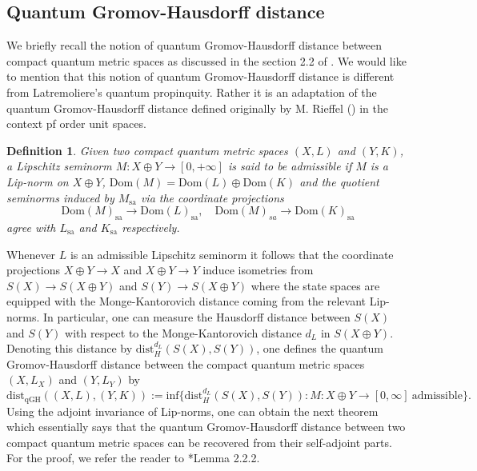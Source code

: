 \documentclass[a4paper,11pt,reqno]{amsart}
\theoremstyle{plain}
\newtheorem{defn}[thm]{Definition}
\theoremstyle{mainthmstyle}
\theoremstyle{named}
\numberwithin{equation}{section}
\begin{document}
\subsection{Quantum Gromov-Hausdorff distance} We briefly recall the notion of quantum Gromov-Hausdorff distance between compact quantum metric spaces as discussed in the section 2.2 of \cite{Kaad-Kyed}. We would like to mention that this notion of quantum Gromov-Hausdorff distance is different from Latremoliere's quantum propinquity. Rather it is an adaptation of the quantum Gromov-Hausdorff distance defined originally by M. Rieffel (\cite{Rieffel-Gromov}) in the context pf order unit spaces. 
\begin{defn}
    Given two compact quantum metric spaces $(X,L)$ and $(Y,K)$, a Lipschitz seminorm $M:X\oplus Y\rightarrow[0,+\infty]$ is said to be admissible if $M$ is a Lip-norm on $X\oplus Y$, $\mathrm{Dom}(M)=\mathrm{Dom}(L)\oplus\mathrm{Dom}(K)$ and the quotient seminorms induced by $M_{\mathrm{sa}}$ via the coordinate projections 
    \begin{displaymath}
        \mathrm{Dom}(M)_{\mathrm{sa}}\rightarrow \mathrm{Dom}(L)_{\mathrm{sa}}, \quad \mathrm{Dom}(M)_{sa}\rightarrow \mathrm{Dom}(K)_{\mathrm{sa}}
    \end{displaymath}
    agree with $L_{\mathrm{sa}}$ and $K_{\mathrm{sa}}$ respectively.
\end{defn}
Whenever $L$ is an admissible Lipschitz seminorm it follows that the coordinate projections $X\oplus Y\rightarrow X$ and $X\oplus Y\rightarrow Y$ induce isometries from $S(X)\rightarrow S(X\oplus Y)$ and $S(Y)\rightarrow S(X\oplus Y)$ where the state spaces are equipped with the Monge-Kantorovich distance coming from the relevant Lip-norms. In particular, one can measure the Hausdorff distance between $S(X)$ and $S(Y)$ with respect to the Monge-Kantorovich distance $d_{L}$ in $S(X\oplus Y)$. Denoting this distance by $\mathrm{dist}^{d_{L}}_{H}(S(X),S(Y))$, one defines the quantum Gromov-Hausdorff distance between the compact quantum metric spaces $(X,L_X)$ and $(Y,L_Y)$ by
\begin{displaymath}
    \mathrm{dist}_{\mathrm {qGH}}((X,L),(Y,K)):=\mathrm{inf}\{\mathrm{dist}^{d_{L}}_{H}(S(X),S(Y)):M:X\oplus Y\rightarrow[0,\infty] \ \mathrm{admissible}\}.
\end{displaymath}
Using the adjoint invariance of Lip-norms, one can obtain the next theorem which essentially says that the quantum Gromov-Hausdorff distance between two compact quantum metric spaces can be recovered from their self-adjoint parts. For the proof, we refer the reader to \cite{Kaad-Kyed}*{Lemma 2.2.2}.
\end{document}
